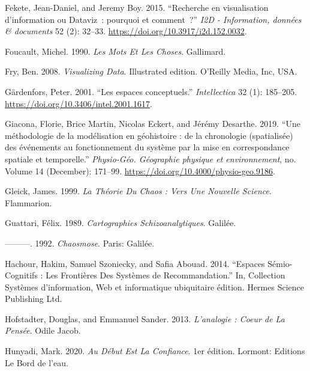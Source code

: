 \documentclass[
  letterpaper,
  DIV=11,
  numbers=noendperiod]{scrreprt}
\newlength{\cslhangindent}
\newlength{\cslentryspacingunit} %
\newenvironment{CSLReferences}[2] %
 {%
  \setlength{\parindent}{0pt}
  \ifodd #1
  \let\oldpar\par
  \def\par{\hangindent=\cslhangindent\oldpar}
  \fi
  \setlength{\parskip}{#2\cslentryspacingunit}
 }%
 {}
\begin{document}
\begin{CSLReferences}{1}{0}
\leavevmode{}%
Fekete, Jean-Daniel, and Jeremy Boy. 2015. {``Recherche en visualisation
d{'}information ou Dataviz~: pourquoi et comment~?''} \emph{I2D -
Information, données \& documents} 52 (2): 32--33.
\url{https://doi.org/10.3917/i2d.152.0032}.

\leavevmode{}%
Foucault, Michel. 1990. \emph{Les Mots Et Les Choses}. Gallimard.

\leavevmode{}%
Fry, Ben. 2008. \emph{Visualizing Data}. Illustrated edition. O'Reilly
Media, Inc, USA.

\leavevmode{}%
Gärdenfors, Peter. 2001. {``Les espaces conceptuels.''}
\emph{Intellectica} 32 (1): 185--205.
\url{https://doi.org/10.3406/intel.2001.1617}.

\leavevmode{}%
Giacona, Florie, Brice Martin, Nicolas Eckert, and Jérémy Desarthe.
2019. {``Une méthodologie de la modélisation en géohistoire : de la
chronologie (spatialisée) des événements au fonctionnement du système
par la mise en correspondance spatiale et temporelle.''}
\emph{Physio-Géo. Géographie physique et environnement}, no. Volume 14
(December): 171--99. \url{https://doi.org/10.4000/physio-geo.9186}.

\leavevmode{}%
Gleick, James. 1999. \emph{La Théorie Du Chaos : Vers Une Nouvelle
Science}. Flammarion.

\leavevmode{}%
Guattari, Félix. 1989. \emph{Cartographies Schizoanalytiques}. Galilée.

\leavevmode{}%
---------. 1992. \emph{Chaosmose}. Paris: Galilée.

\leavevmode{}%
Hachour, Hakim, Samuel Szoniecky, and Safia Abouad. 2014. {``Espaces
Sémio-Cognitifs : Les Frontières Des Systèmes de Recommandation.''} In,
Collection Systèmes d'information, Web et informatique ubiquitaire
édition. Hermes Science Publishing Ltd.

\leavevmode{}%
Hofstadter, Douglas, and Emmanuel Sander. 2013. \emph{L'analogie : Coeur
de La Pensée}. Odile Jacob.

\leavevmode{}%
Hunyadi, Mark. 2020. \emph{Au Début Est La Confiance}. 1er édition.
Lormont: Editions Le Bord de l'eau.


\end{CSLReferences}
\end{document}
